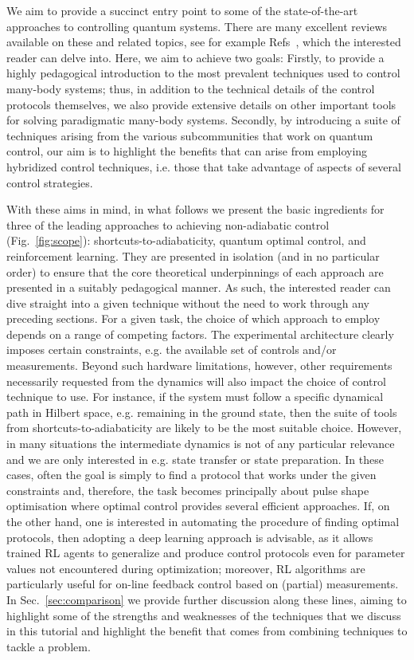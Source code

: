 We aim to provide a succinct entry point to some of the state-of-the-art approaches to controlling quantum systems. There are many excellent reviews available on these and related topics, see for example Refs~\cite{Deffner2017, Glaser2015, Koch2022, STAreview, Stefanatos2020, PRXQtutorial, GiannelliPLA, Hatomura2024, ansel2024_arxiv, deffner2020thermodynamic}, which the interested reader can delve into. Here, we aim to achieve two goals: Firstly, to provide a highly pedagogical introduction to the most prevalent techniques used to control many-body systems; thus, in addition to the technical details of the control protocols themselves, we also provide extensive details on other important tools for solving paradigmatic many-body systems. Secondly, by introducing a suite of techniques arising from the various subcommunities that work on quantum control, our aim is to highlight the benefits that can arise from employing hybridized control techniques, i.e. those that take advantage of aspects of several control strategies.

With these aims in mind, in what follows we present the basic ingredients for three of the leading approaches to achieving non-adiabatic control (Fig.~\ref{fig:scope}): shortcuts-to-adiabaticity, quantum optimal control, and reinforcement learning. They are presented in isolation (and in no particular order) to ensure that the core theoretical underpinnings of each approach are presented in a suitably pedagogical manner. As such, the interested reader can dive straight into a given technique without the need to work through any preceding sections. For a given task, the choice of which approach to employ depends on a range of competing factors. The experimental architecture clearly imposes certain constraints, e.g. the available set of controls and/or measurements. Beyond such hardware limitations, however, other requirements necessarily requested from the dynamics will also impact the choice of control technique to use. For instance, if the system must follow a specific dynamical path in Hilbert space, e.g. remaining in the ground state, then the suite of tools from shortcuts-to-adiabaticity are likely to be the most suitable choice. However, in many situations the intermediate dynamics is not of any particular relevance and we are only interested in e.g. state transfer or state preparation. In these cases, often the goal is simply to find a protocol that works under the given constraints and, therefore, the task becomes principally about pulse shape optimisation where optimal control provides several efficient approaches. If, on the other hand, one is interested in automating the procedure of finding optimal protocols, then adopting a deep learning approach is advisable, as it allows trained RL agents to generalize and produce control protocols even for parameter values not encountered during optimization; moreover, RL algorithms are particularly useful for on-line feedback control based on (partial) measurements. In Sec.~\ref{sec:comparison} we provide further discussion along these lines, aiming to highlight some of the strengths and weaknesses of the techniques that we discuss in this tutorial and highlight the benefit that comes from combining techniques to tackle a problem.

